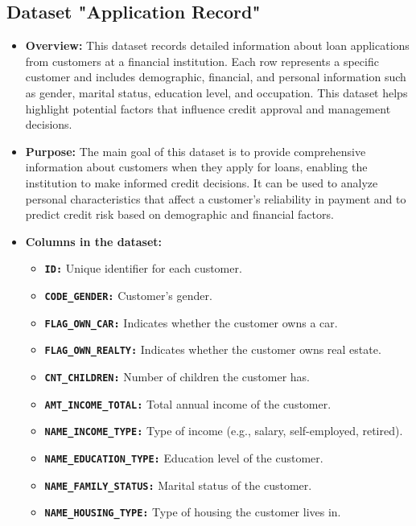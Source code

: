 \documentclass[12pt]{report}
\begin{document}
    \subsection{Dataset "Application Record"}
    \begin{itemize}
        \item {\bfseries Overview:} This dataset records detailed information about loan applications from customers at a financial institution. Each row represents a specific customer and includes demographic, financial, and personal information such as gender, marital status, education level, and occupation. This dataset helps highlight potential factors that influence credit approval and management decisions.
        \item {\bfseries Purpose:} The main goal of this dataset is to provide comprehensive information about customers when they apply for loans, enabling the institution to make informed credit decisions. It can be used to analyze personal characteristics that affect a customer's reliability in payment and to predict credit risk based on demographic and financial factors.
        \item {\bfseries Columns in the dataset:}
        \begin{itemize}
            \item {\bfseries \texttt{ID:}} Unique identifier for each customer.
            \item {\bfseries \texttt{CODE\_GENDER:}} Customer’s gender.
            \item {\bfseries \texttt{FLAG\_OWN\_CAR:}} Indicates whether the customer owns a car.
            \item {\bfseries \texttt{FLAG\_OWN\_REALTY:}} Indicates whether the customer owns real estate.
            \item {\bfseries \texttt{CNT\_CHILDREN:}} Number of children the customer has.
            \item {\bfseries \texttt{AMT\_INCOME\_TOTAL:}} Total annual income of the customer.
            \item {\bfseries \texttt{NAME\_INCOME\_TYPE:}} Type of income (e.g., salary, self-employed, retired).
            \item {\bfseries \texttt{NAME\_EDUCATION\_TYPE:}} Education level of the customer.
            \item {\bfseries \texttt{NAME\_FAMILY\_STATUS:}} Marital status of the customer.
            \item {\bfseries \texttt{NAME\_HOUSING\_TYPE:}} Type of housing the customer lives in.

\end{itemize}
\end{itemize}
\end{document}
